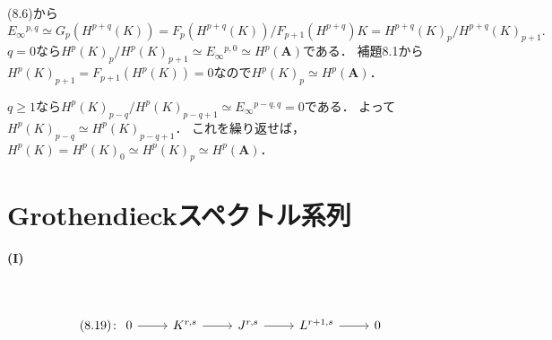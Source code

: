 (8.6)から
\[
E_\infty{}^{p, q} \simeq G_p(H^{p+q}(K)) = F_p(H^{p+q}(K)) / F_{p+1}(H^{p+q})K = H^{p+q}(K)_p / H^{p+q}(K)_{p+1} .
\]
\(q=0\)なら\(H^p(K)_p / H^p(K)_{p+1} \simeq E_\infty{}^{p, 0} \simeq H^p(\boldsymbol{A})\)である．
補題8.1から\(H^p(K)_{p+1} = F_{p+1}(H^p(K)) = 0\)なので\(H^p(K)_p \simeq H^p(\boldsymbol{A})\)．

\(q\geq1\)なら\(H^p(K)_{p-q} / H^p(K)_{p-q+1} \simeq E_\infty{}^{p-q, q} = 0\)である．
よって\(H^p(K)_{p-q} \simeq H^p(K)_{p-q+1}\)．
これを繰り返せば，\(H^p(K) = H^p(K)_0 \simeq H^p(K)_p \simeq H^p(\boldsymbol{A})\)．

\section{Grothendieckスペクトル系列}
\paragraph{(I)}~
\begin{screen}
  \[
  (8.19)\colon
  \begin{tikzcd}
    0 \arrow[r] & K^{r, s} \arrow[r] & J^{r, s} \arrow[r] & L^{r+1, s} \arrow[r] & 0
  \end{tikzcd}
  \]
\end{screen}
